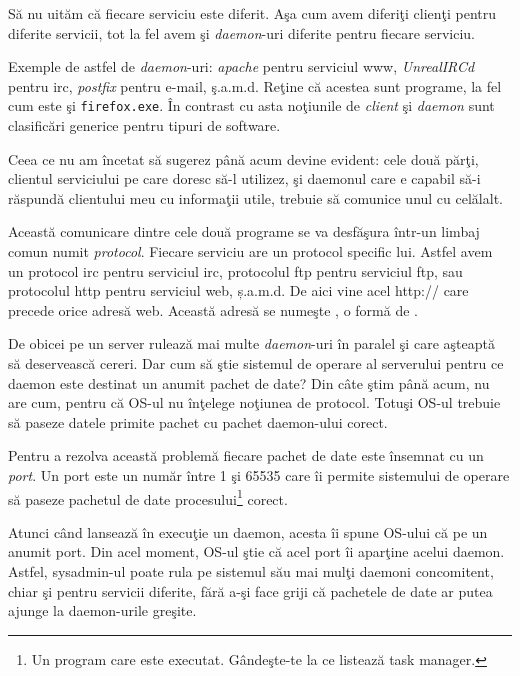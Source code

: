 Să nu uităm că fiecare serviciu este diferit. Aşa cum avem diferiţi clienţi pentru
diferite servicii, tot la fel avem şi \textit{daemon}-uri diferite pentru fiecare serviciu.

Exemple de astfel de \textit{daemon}-uri: \textsl{apache} pentru serviciul
www, \textsl{UnrealIRCd} pentru irc,
\textsl{postfix} pentru e-mail, ş.a.m.d. Reţine că acestea sunt programe, la fel
cum este şi \texttt{firefox.exe}. În contrast cu asta noţiunile de \textit{client} şi
\textit{daemon} sunt clasificări
generice pentru tipuri de software.

Ceea ce nu am încetat să sugerez până acum devine evident: cele două părţi, clientul
serviciului pe care doresc să-l utilizez, şi daemonul care e capabil să-i răspundă
clientului meu cu informaţii utile, trebuie să comunice unul cu celălalt.

Această comunicare dintre cele două programe se va desfăşura într-un limbaj comun numit
\textsl{protocol}. Fiecare serviciu are un protocol specific lui. Astfel avem un
protocol irc pentru serviciul irc, protocolul ftp pentru serviciul ftp,
sau protocolul http pentru serviciul web, ș.a.m.d. De aici vine acel {\glqq}http://{\grqq} care precede
orice adresă web. Această adresă se numeşte
,
o formă de .

De obicei pe un server rulează mai multe \textit{daemon}-uri în paralel şi care
aşteaptă să deservească cereri. Dar cum să ştie sistemul de operare al serverului
pentru ce daemon este destinat un anumit pachet de date? Din câte ştim până acum,
nu are cum, pentru că OS-ul nu înţelege noţiunea de {\glqq}protocol{\grqq}. Totuşi OS-ul trebuie
să paseze datele primite pachet cu pachet daemon-ului corect.

Pentru a rezolva această problemă fiecare pachet de date este {\glqq}însemnat{\grqq} cu un \textsl{port}.
Un port este un număr între 1 şi 65535 care îi permite sistemului de operare să
paseze pachetul de date procesului\footnote{Un program care este executat. Gândeşte-te
la ce listează {\glqq}task manager{\grqq}.} corect.

Atunci când  lansează în execuţie un daemon,
acesta îi spune OS-ului că 
pe un anumit port. Din acel moment, OS-ul
{\glqq}ştie{\grqq} că acel port îi {\glqq}aparţine{\grqq} acelui daemon. Astfel, sysadmin-ul poate rula
pe sistemul său mai mulţi daemoni concomitent, chiar şi pentru servicii diferite, fără
a-şi face griji că pachetele de date ar putea ajunge la daemon-urile greşite.

